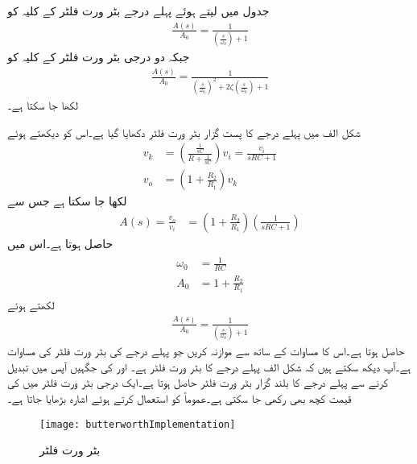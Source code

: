 جدول  میں  لیتے ہوئے پہلے درجے  بٹر ورت فلٹر کے کلیہ      کو
\begin{align}\label{مساوات_تعددی_بٹرورت_پہلا_درجہ}
\frac{A(s)}{A_0}=\frac{1}{\left(\frac{s}{\omega_0}\right)+1}
\end{align}
جبکہ دو درجی بٹر ورت فلٹر کے کلیہ      کو
\begin{align}\label{مساوات_تعددی_بٹرورت_دوسرا_درجہ}
\frac{A(s)}{A_0}=\frac{1}{\left(\frac{s}{\omega_0} \right)^2+2 \zeta \left(\frac{s}{\omega_0} \right)+1}
\end{align}
لکھا جا سکتا ہے۔

شکل  الف میں پہلے درجے کا پست گزار بٹر ورت فلٹر دکھایا گیا ہے۔اس کو دیکھتے ہوئے
\begin{align*}
v_k&=\left(\frac{\frac{1}{sC}}{R+\frac{1}{sC}} \right) v_i=\frac{v_i}{sRC+1}\\
v_o&=\left(1+\frac{R_2}{R_1} \right)v_k
\end{align*}
لکھا جا سکتا ہے جس سے
\begin{align*}
A(s) =\frac{v_o}{v_i}&=\left(1+\frac{R_2}{R_1} \right)\left(\frac{1}{sRC+1}\right)
\end{align*}
حاصل ہوتا ہے۔اس میں
\begin{gather}
\begin{aligned}\label{مساوات_تعددی_ردعمل_بٹرورت_پہلا_درجہ}
\omega_0&=\frac{1}{RC}\\
A_0&=1+\frac{R_2}{R_1}
\end{aligned}
\end{gather}
لکھتے ہوئے
\begin{align*}
\frac{A(s)}{A_0}=\frac{1}{\left(\frac{s}{\omega_0}\right)+1}
\end{align*}
حاصل ہوتا ہے۔اس کا مساوات  کے ساتھ سے موازنہ کریں جو پہلے درجے کی بٹر ورت فلٹر کی مساوات ہے۔آپ دیکھ سکتے ہیں کہ شکل  الف پہلے درجے کا بٹر ورت فلٹر ہے۔ اور  کی جگہیں آپس میں تبدیل کرنے سے پہلے درجے کا بلند گزار بٹر ورت فلٹر حاصل ہوتا ہے۔ایک درجی بٹر ورت فلٹر میں  کی قیمت کچھ بھی رکھی جا سکتی ہے۔عموماً  کو استعمال کرتے ہوئے اشارہ بڑھایا جاتا ہے۔
\begin{figure}
\centering
\texttt{[image: butterworthImplementation]}
\caption{بٹر ورت فلٹر}
\label{شکل_تعددی_ردعمل_بٹر_ورت_فلٹر_دور}
\end{figure}
%

